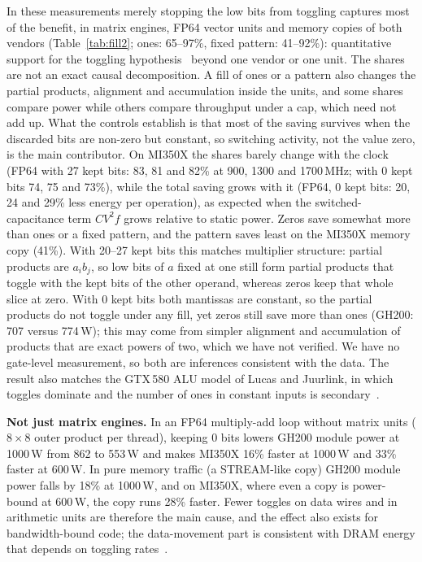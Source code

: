 \documentclass[conference]{IEEEtran}
\newcommand{\W}{\,W}
\newcommand{\pct}{\%}
\begin{document}
In these measurements merely stopping the low bits from toggling captures most of the benefit, in matrix engines,
FP64 vector units and memory copies of both vendors (Table~\ref{tab:fill2}; ones: 65--97\pct, fixed pattern:
41--92\pct): quantitative support for the toggling hypothesis~\cite{Gregersen2024} beyond one vendor or one unit. The
shares are not an exact causal decomposition. A fill of ones or a pattern also changes the partial products, alignment
and accumulation inside the units, and some shares compare power while others compare throughput under a cap, which
need not add up. What the controls establish is that most of the saving survives when the discarded bits are non-zero
but constant, so switching activity, not the value zero, is the main contributor. On MI350X the shares barely change with the
clock (FP64 with 27 kept bits: 83, 81 and 82\pct{} at 900, 1300 and 1700\,MHz; with 0 kept bits 74, 75 and 73\pct),
while the total saving grows with it (FP64, 0 kept bits: 20, 24 and 29\pct{} less energy per operation), as expected
when the switched-capacitance term $CV^2f$ grows relative to static power. Zeros save somewhat more than ones or a
fixed pattern, and the pattern saves least on the MI350X memory copy (41\pct). With 20--27 kept bits this matches multiplier structure: partial products are $a_i b_j$, so low bits of
$a$ fixed at one still form partial products that toggle with the kept bits of the other operand, whereas zeros keep
that whole slice at zero. With 0 kept bits both mantissas are constant, so the partial products do not toggle under
any fill, yet zeros still save more than ones (GH200: 707 versus 774\W); this may come from simpler alignment and
accumulation of products that are exact powers of two, which we have not verified. We have no gate-level
measurement, so both are inferences consistent with the data. The result also matches the GTX\,580 ALU model of
Lucas and Juurlink, in which toggles dominate and the number of ones in constant inputs is
secondary~\cite{Lucas2016}.

\textbf{Not just matrix engines.} In an FP64 multiply-add loop without matrix units ($8{\times}8$ outer product per
thread), keeping 0 bits lowers GH200 module power at 1000\W{} from 862 to 553\W{} and makes MI350X 16\pct{} faster
at 1000\W{} and 33\pct{} faster at 600\W. In pure memory traffic (a STREAM-like copy) GH200 module power falls by
18\pct{} at 1000\W, and on MI350X, where even a copy is power-bound at 600\W, the copy runs 28\pct{} faster.
Fewer toggles on data wires and in arithmetic units are therefore the main cause, and the effect also exists for
bandwidth-bound code; the data-movement part is consistent with DRAM energy that depends on toggling
rates~\cite{Chatterjee2017,Ghose2018}.
\end{document}
